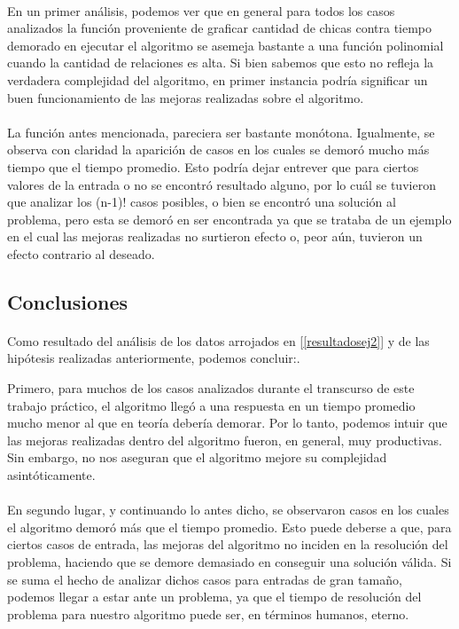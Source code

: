 \paragraph{}
En un primer análisis, podemos ver que en general para todos los casos analizados la función proveniente de graficar cantidad de chicas contra tiempo demorado en ejecutar el algoritmo se asemeja bastante a una función polinomial cuando la cantidad de relaciones es alta. Si bien sabemos que esto no refleja la verdadera complejidad del algoritmo, en primer instancia podría significar un buen funcionamiento de las mejoras realizadas sobre el algoritmo.

\paragraph{}
La función antes mencionada, pareciera ser bastante monótona. Igualmente, se observa con claridad la aparición de casos en los cuales se demoró mucho más tiempo que el tiempo promedio. Esto podría dejar entrever que para ciertos valores de la entrada o no se encontró resultado alguno, por lo cuál se tuvieron que analizar los (n-1)! casos posibles, o bien se encontró una solución al problema, pero esta se demoró en ser encontrada ya que se trataba de un ejemplo en el cual las mejoras realizadas no surtieron efecto o, peor aún, tuvieron un efecto contrario al deseado.


\subsection{Conclusiones}

\paragraph{}
Como resultado del análisis de los datos arrojados en [\ref{resultadosej2}] y de las hipótesis realizadas anteriormente, podemos concluir:.

Primero, para muchos de los casos analizados durante el transcurso de este trabajo práctico, el algoritmo llegó a una respuesta en un tiempo promedio mucho menor al que en teoría debería demorar. Por lo tanto, podemos intuir que las mejoras realizadas dentro del algoritmo fueron, en general, muy productivas. Sin embargo, no nos aseguran que el algoritmo mejore su complejidad asintóticamente.

\paragraph{}
En segundo lugar, y continuando lo antes dicho, se observaron casos en los cuales el algoritmo demoró más que el tiempo promedio. Esto puede deberse a que, para ciertos casos de entrada, las mejoras del algoritmo no inciden en la resolución del problema, haciendo que se demore demasiado en conseguir una solución válida. Si se suma el hecho de analizar dichos casos para entradas de gran tamaño, podemos llegar a estar ante un problema, ya que el tiempo de resolución del problema para nuestro algoritmo puede ser, en términos humanos, eterno.

